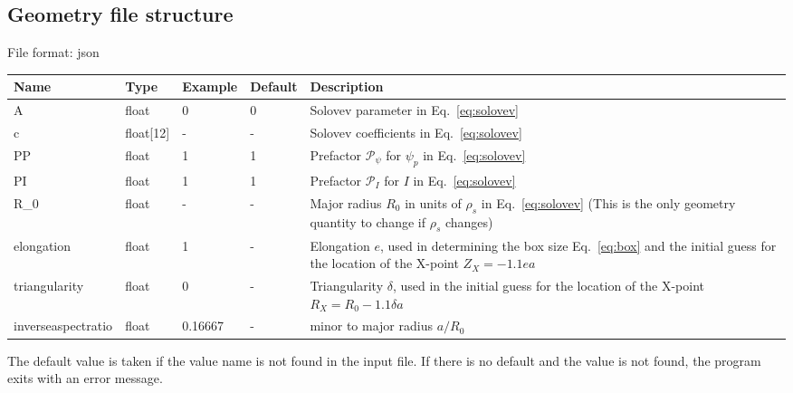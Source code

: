 \subsection{Geometry file structure} \label{sec:geometry_file}
File format: json

\begin{longtable}{llll>{\RaggedRight}p{7cm}}
\toprule
\rowcolor{gray!50}\textbf{Name} &  \textbf{Type} & \textbf{Example} & \textbf{Default} & \textbf{Description}  \\ \midrule
    A      & float & 0 &  0 & Solovev parameter in Eq.~\eqref{eq:solovev} \\
    c      & float[12] &  - & - & Solovev coefficients in Eq.~\eqref{eq:solovev} \\
    PP     & float & 1 &  1 & Prefactor $\mathcal P_\psi$ for $\psi_p$ in Eq.~\eqref{eq:solovev} \\
    PI     & float & 1 &  1 & Prefactor $\mathcal P_I$ for $I$ in Eq.~\eqref{eq:solovev} \\
    R\_0   & float & - & -  & Major radius $R_0$ in units of $\rho_s$ in Eq.~\eqref{eq:solovev} (This is the only geometry quantity to change if $\rho_s$ changes)\\
    elongation    & float & 1 & - & Elongation $e$, used in determining the box size Eq.~\eqref{eq:box} and the initial guess for the location of the X-point $Z_X = -1.1 ea$ \\
    triangularity & float & 0 & - & Triangularity $\delta$, used in the initial guess for the location of the X-point $R_X = R_0-1.1\delta a$ \\
    inverseaspectratio & float & 0.16667 & - & minor to major radius $a/R_0$ \\
\bottomrule
\end{longtable}
The default value is taken if the value name is not found in the input file. If there is no default and
the value is not found,
the program exits with an error message.

